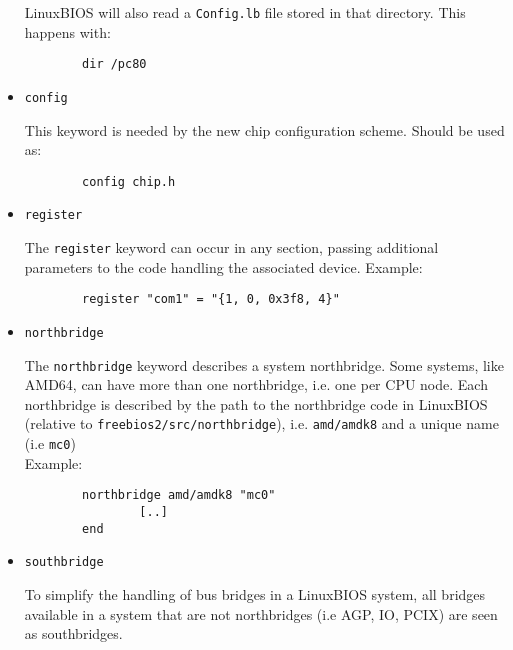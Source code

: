 \documentclass[titlepage,12pt]{article}
\begin{document}
\begin{itemize}
LinuxBIOS will also read a \texttt{Config.lb} file stored in that
directory. This happens with:

\begin{verbatim}
        dir /pc80
\end{verbatim}


\item \begin{verbatim}config\end{verbatim}

This keyword is needed by the new chip configuration scheme. Should be
used as:

\begin{verbatim}
        config chip.h
\end{verbatim}

\item \begin{verbatim}register\end{verbatim}
The \texttt{register} keyword can occur in any section, passing
additional \\
parameters to the code handling the associated device.
Example:

\begin{verbatim}
        register "com1" = "{1, 0, 0x3f8, 4}"
\end{verbatim}

\item \begin{verbatim}northbridge\end{verbatim}

The \texttt{northbridge} keyword describes a system northbridge. Some
systems, like AMD64, can have more than one northbridge, i.e. one per
CPU node. Each northbridge is described by the path to the northbridge
code in LinuxBIOS (relative to \texttt{freebios2/src/northbridge}), i.e.
\texttt{amd/amdk8} and a unique name (i.e \texttt{mc0}) \\
Example:

\begin{verbatim}
        northbridge amd/amdk8 "mc0"
                [..]
        end
\end{verbatim}

\item \begin{verbatim}southbridge\end{verbatim}

To simplify the handling of bus bridges in a LinuxBIOS system, all
bridges available in a system that are not northbridges (i.e AGP, IO,
PCIX) are seen as southbridges.


\end{itemize}
\end{document}
